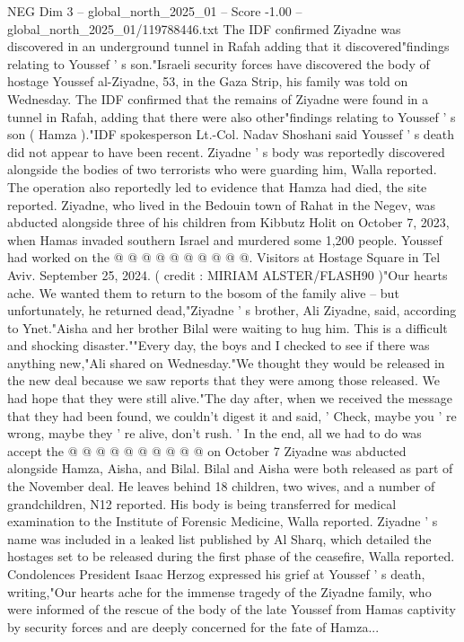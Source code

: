 \begin{textsample}{NEG Dim 3 – global\_north\_2025\_01 – Score -1.00 – global\_north\_2025\_01/119788446.txt}  \label{ex:f3_neg_197}
The IDF confirmed Ziyadne was discovered in an underground tunnel in Rafah adding that it discovered"findings relating to Youssef ' s son."Israeli security forces have discovered the body of hostage Youssef al-Ziyadne, 53, in the Gaza Strip, his family was told on Wednesday.
The IDF confirmed that the remains of Ziyadne were found in a tunnel in Rafah, adding that there were also other"findings relating to Youssef ' s son ( Hamza )."IDF spokesperson Lt.-Col.
Nadav Shoshani said Youssef ' s death did not appear to have been recent.
Ziyadne ' s body was reportedly discovered alongside the bodies of two terrorists who were guarding him, Walla reported.
The operation also reportedly led to evidence that Hamza had died, the site reported.
Ziyadne, who lived in the Bedouin town of Rahat in the Negev, was abducted alongside three of his children from Kibbutz Holit on October 7, 2023, when Hamas invaded southern Israel and murdered some 1,200 people.
Youssef had worked on the @ @ @ @ @ @ @ @ @ @.
Visitors at Hostage Square in Tel Aviv.
September 25, 2024. ( credit : MIRIAM ALSTER/FLASH90 )"Our hearts ache.
We wanted them to return to the bosom of the family alive -- but unfortunately, he returned dead,"Ziyadne ' s brother, Ali Ziyadne, said, according to Ynet."Aisha and her brother Bilal were waiting to hug him.
This is a difficult and shocking disaster.""Every day, the boys and I checked to see if there was anything new,"Ali shared on Wednesday."We thought they would be released in the new deal because we saw reports that they were among those released.
We had hope that they were still alive."The day after, when we received the message that they had been found, we couldn't digest it and said, ' Check, maybe you ' re wrong, maybe they ' re alive, don't rush. ' In the end, all we had to do was accept the @ @ @ @ @ @ @ @ @ @ on October 7 Ziyadne was abducted alongside Hamza, Aisha, and Bilal.
Bilal and Aisha were both released as part of the November deal.
He leaves behind 18 children, two wives, and a number of grandchildren, N12 reported.
His body is being transferred for medical examination to the Institute of Forensic Medicine, Walla reported.
Ziyadne ' s name was included in a leaked list published by Al Sharq, which detailed the hostages set to be released during the first phase of the ceasefire, Walla reported.
Condolences President Isaac Herzog expressed his grief at Youssef ' s death, writing,"Our hearts ache for the immense tragedy of the Ziyadne family, who were informed of the rescue of the body of the late Youssef from Hamas captivity by security forces and are deeply concerned for the fate of Hamza...

\end{textsample}
